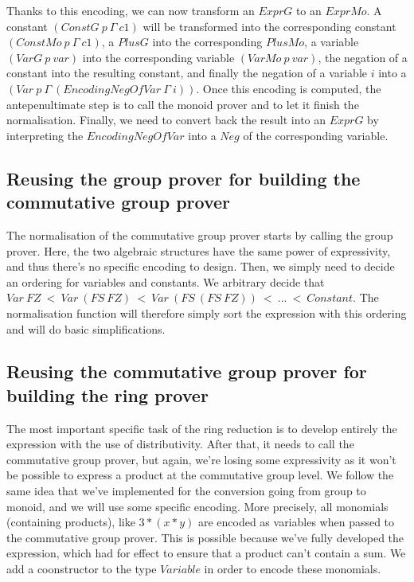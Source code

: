 Thanks to this encoding, we can now transform an $ExprG$ to an $ExprMo$. A constant $(ConstG\ p\ \Gamma\ c1)$ will be transformed into the corresponding constant $(ConstMo\ p\ \Gamma\ c1)$, a $PlusG$ into the corresponding $PlusMo$, a variable $(VarG\ p\ var)$ into the corresponding variable $(VarMo\ p\ var)$, the negation of a constant into the resulting constant, and finally the negation of a variable $i$ into a $(Var\ p\ \Gamma\ (EncodingNegOfVar\ \Gamma\ i))$.
Once this encoding is computed, the antepenultimate step is to call the monoid prover and to let it finish the normalisation. Finally, we need to convert back the result into an $ExprG$ by interpreting the $EncodingNegOfVar$ into a $Neg$ of the corresponding variable.


\subsection {Reusing the group prover for building the commutative group prover}

The normalisation of the commutative group prover starts by calling the group prover. Here, the two algebraic structures have the same power of expressivity, and thus there's no specific encoding to design. Then, we simply need to decide an ordering for variables and constants. We arbitrary decide that $Var\ FZ\ <\ Var\ (FS\ FZ)\ <\ Var\ (FS\ (FS\ FZ))\ <\ ...\ <\ Constant$. The normalisation function will therefore simply sort the expression with this ordering and will do basic simplifications.



\subsection {Reusing the commutative group prover for building the ring prover}

The most important specific task of the ring reduction is to develop entirely the expression with the use of distributivity. After that, it needs to call the commutative group prover, but again, we're losing some expressivity as it won't be possible to express a product at the commutative group level. We follow the same idea that we've implemented for the conversion going from group to monoid, and we will use some specific encoding. More precisely, all monomials (containing products), like $3*(x*y)$ are encoded as variables when passed to the commutative group prover. This is possible because we've fully developed the expression, which had for effect to ensure that a product can't contain a sum.
We add a coonstructor to the type $Variable$ in order to encode these monomials.



